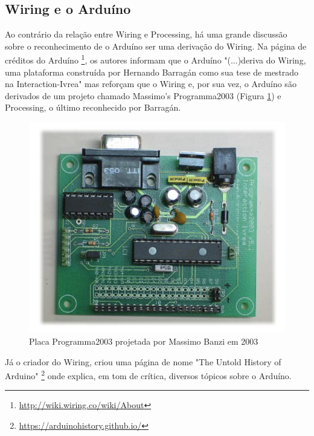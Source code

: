 \subsection{Wiring e o Arduíno}

Ao contrário da relação entre Wiring e Processing, há uma grande discussão sobre o reconhecimento de o Arduíno ser uma derivação do Wiring.
Na página de créditos do Arduíno \footnote{\url{http://wiki.wiring.co/wiki/About}}, os autores informam que o Arduíno "(...)deriva do Wiring, uma plataforma construída por Hernando Barragán como sua tese de mestrado na Interaction-Ivrea" mas reforçam que o Wiring e, por sua vez, o Arduíno são derivados de um projeto chamado Massimo's Programma2003 (Figura \ref{programma2003}) e Processing, o último reconhecido por Barragán. 

\begin{figure}[htb]
	\caption{\label{programma2003}Placa Programma2003 projetada por Massimo Banzi em 2003}
	\begin{center}
	    \includegraphics[scale=0.3]{refs/Programma2003}
	\end{center}
\end{figure}

Já o criador do Wiring, criou uma página de nome "The Untold History of Arduino" \footnote{\url{https://arduinohistory.github.io/}} onde explica, em tom de crítica, diversos tópicos sobre o Arduíno.

